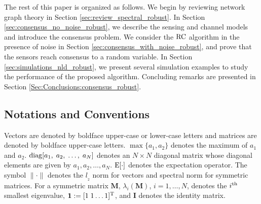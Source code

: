 \documentclass[onecolumn, draft, 12pt]{IEEEtran}
\newcommand{\E}{{\rm E}}
\newcommand{\rnld}{\rm RC}
\newcommand{\onevect}{\mathbf{1}}
\newcommand{\I}{\mathbf{I}}
\newcommand{\Pm}{\mathbf{M}}
\begin{document}
The rest of this paper is organized as follows. We begin by reviewing network graph theory in Section \ref{sec:review_spectral_robust}. In Section \ref{sec:consensus_no_noise_robust}, we describe the sensing and channel models and introduce the consensus problem. We consider the $\rnld$ algorithm in the presence of noise in Section \ref{sec:consensus_with_noise_robust}, and prove that the sensors reach consensus to a random variable. In Section  \ref{sec:simulations_nld_robust}, we present several simulation examples to study the performance of the proposed algorithm. Concluding remarks are presented in Section \ref{Sec:Conclusions:consensus_robust}. 

\subsection*{Notations and Conventions}\label{subsec:nld_notations_robust}
Vectors are denoted by boldface upper-case or lower-case letters and matrices are denoted by boldface upper-case letters. $\max \lbrace a_1 , a_2\rbrace$ denotes the maximum of $a_1$ and $a_2$. ${\rm diag} [a_{1},\;  a_{2}, \; \ldots, \; a_{N}]$ denotes an $N \times N$ diagonal matrix whose diagonal elements are given by $a_{1}, a_{2}, \ldots, a_{N}$. $\E[\cdot]$ denotes the expectation operator. The symbol $\| \cdot \|$ denotes the ${l}_{_{2}}$ norm for vectors and spectral norm for symmetric matrices. For a symmetric matrix $\Pm$, $\lambda_i(\Pm)$, $i=1, \ldots, N$, denotes the $i^{\rm th}$ smallest eigenvalue, $\onevect: = [ 1 \; 1 \ldots 1]^{\rm T}$, and $\I$ denotes the identity matrix. 
\end{document}
